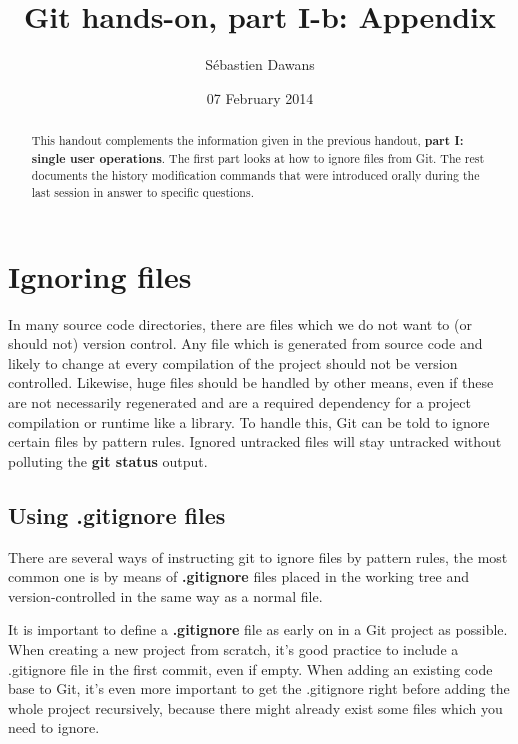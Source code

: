 \documentclass{../common/tufte-latex/tufte-handout}
\title{Git hands-on, part I-b: Appendix}
\author{S\'ebastien Dawans}
\date{07 February 2014} %
\begin{document}
\maketitle%

\begin{abstract}
\noindent
This handout complements the information given in the previous handout, \textbf{part I: single user operations}.
The first part looks at how to ignore files from Git.
The rest documents the history modification commands that were introduced orally during the last session in answer to specific questions.
\end{abstract}

\section{Ignoring files}
In many source code directories, there are files which we do not want to (or should not) version control.
Any file which is generated from source code and likely to change at every compilation of the project should not be version controlled.
Likewise, huge files should be handled by other means, even if these are not necessarily regenerated and are a required dependency for a project compilation or runtime like a library.
To handle this, Git can be told to ignore certain files by pattern rules.
Ignored untracked files will stay untracked without polluting the \textbf{git status} output.

\subsection{Using .gitignore files}
There are several ways of instructing git to ignore files by pattern rules, the most common one is by means of \textbf{.gitignore} files placed in the working tree and version-controlled in the same way as a normal file.

It is important to define a \textbf{.gitignore} file as early on in a Git project as possible.
When creating a new project from scratch, it's good practice to include a .gitignore file in the first commit, even if empty.
When adding an existing code base to Git, it's even more important to get the .gitignore right before adding the whole project recursively, because there might already exist some files which you need to ignore.
\end{document}
